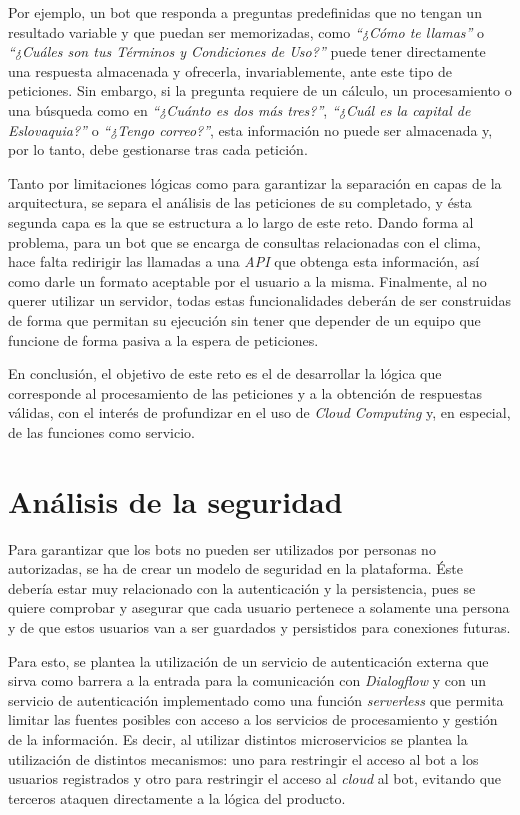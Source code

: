 \documentclass[11pt,spanish,listoffigures]{tfgetsinf}
\begin{document}
Por ejemplo, un bot que responda a preguntas predefinidas que no tengan un resultado variable y que puedan ser memorizadas, como \textit{“¿Cómo te llamas”} o \textit{“¿Cuáles son tus Términos y Condiciones de Uso?”} puede tener directamente una respuesta almacenada y ofrecerla, invariablemente, ante este tipo de peticiones. Sin embargo, si la pregunta requiere de un cálculo, un procesamiento o una búsqueda como en \textit{“¿Cuánto es dos más tres?”}, \textit{“¿Cuál es la capital de Eslovaquia?”} o \textit{“¿Tengo correo?”}, esta información no puede ser almacenada y, por lo tanto, debe gestionarse tras cada petición.

Tanto por limitaciones lógicas como para garantizar la separación en capas de la arquitectura, se separa el análisis de las peticiones de su completado, y ésta segunda capa es la que se estructura a lo largo de este reto. Dando forma al problema, para un bot que se encarga de consultas relacionadas con el clima, hace falta redirigir las llamadas a una \textit{API} que obtenga esta información, así como darle un formato aceptable por el usuario a la misma. Finalmente, al no querer utilizar un servidor, todas estas funcionalidades deberán de ser construidas de forma que permitan su ejecución sin tener que depender de un equipo que funcione de forma pasiva a la espera de peticiones.

En conclusión, el objetivo de este reto es el de desarrollar la lógica que corresponde al procesamiento de las peticiones y a la obtención de respuestas válidas, con el interés de profundizar en el uso de \textit{Cloud Computing} y, en especial, de las funciones como servicio.

\section{Análisis de la seguridad}
\label{sec:analisis-de-la-seguridad}

Para garantizar que los bots no pueden ser utilizados por personas no autorizadas, se ha de crear un modelo de seguridad en la plataforma. Éste debería estar muy relacionado con la autenticación y la persistencia, pues se quiere comprobar y asegurar que cada usuario pertenece a solamente una persona y de que estos usuarios van a ser guardados y persistidos para conexiones futuras.

Para esto, se plantea la utilización de un servicio de autenticación externa que sirva como barrera a la entrada para la comunicación con \textit{Dialogflow} y con un servicio de autenticación implementado como una función \textit{serverless} que permita limitar las fuentes posibles con acceso a los servicios de procesamiento y gestión de la información. Es decir, al utilizar distintos microservicios se plantea la utilización de distintos mecanismos: uno para restringir el acceso al bot a los usuarios registrados y otro para restringir el acceso al \textit{cloud} al bot, evitando que terceros ataquen directamente a la lógica del producto.
\end{document}
